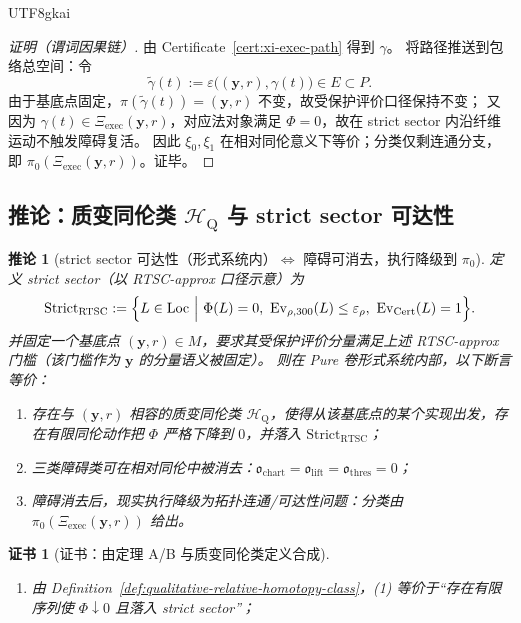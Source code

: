 \documentclass[12pt]{article}
\newtheorem{corollary}{推论}[section]
\newtheorem{certificate}{证书}[section]
\begin{document}
\begin{CJK*}{UTF8}{gkai}
\begin{proof}[证明（谓词因果链）]
由 Certificate~\ref{cert:xi-exec-path} 得到 $\gamma$。
将路径推送到包络总空间：令
\[
\widetilde{\gamma}(t):=\varepsilon\bigl((\mathbf{y},r),\gamma(t)\bigr)\in E\subset P.
\]
由于基底点固定，$\pi(\widetilde{\gamma}(t))=(\mathbf{y},r)$ 不变，故受保护评价口径保持不变；
又因为 $\gamma(t)\in \Xi_{\mathrm{exec}}(\mathbf{y},r)$，对应法对象满足 $\Phi=0$，故在 strict sector 内沿纤维运动不触发障碍复活。
因此 $\xi_0,\xi_1$ 在相对同伦意义下等价；分类仅剩连通分支，即 $\pi_0(\Xi_{\mathrm{exec}}(\mathbf{y},r))$。证毕。
\end{proof}

\subsection{推论：质变同伦类 $\mathcal{H}_{\mathrm{Q}}$ 与 strict sector 可达性}

\begin{corollary}[strict sector 可达性（形式系统内）$\Longleftrightarrow$ 障碍可消去，执行降级到 $\pi_0$]
\label{cor:qualitative-breakthrough}
定义 strict sector（以 \textsf{RTSC-approx} 口径示意）为
\[
\mathrm{Strict}_{\mathrm{RTSC}}
:=
\Bigl\{
L\in\mathrm{Loc}\ \Big|\ \Phi(L)=0,\ \mathrm{Ev}_{\rho,300}(L)\le \varepsilon_{\rho},\ \mathrm{Ev}_{\mathrm{Cert}}(L)=1
\Bigr\}.
\]
并固定一个基底点 $(\mathbf{y},r)\in M$，要求其受保护评价分量满足上述 \textsf{RTSC-approx} 门槛（该门槛作为 $\mathbf{y}$ 的分量语义被固定）。
则在 Pure 卷形式系统内部，以下断言等价：
\begin{enumerate}
  \item 存在与 $(\mathbf{y},r)$ 相容的质变同伦类 $\mathcal{H}_{\mathrm{Q}}$，使得从该基底点的某个实现出发，存在有限同伦动作把 $\Phi$ 严格下降到 $0$，并落入
    $\mathrm{Strict}_{\mathrm{RTSC}}$；
  \item 三类障碍类可在相对同伦中被消去：$\mathfrak{o}_{\mathrm{chart}}=\mathfrak{o}_{\mathrm{lift}}=\mathfrak{o}_{\mathrm{thres}}=0$；
  \item 障碍消去后，现实执行降级为拓扑连通/可达性问题：分类由 $\pi_0(\Xi_{\mathrm{exec}}(\mathbf{y},r))$ 给出。
\end{enumerate}
\end{corollary}

\begin{certificate}[证书：由定理 A/B 与质变同伦类定义合成]
\label{cert:qualitative-breakthrough}
\begin{enumerate}
  \item 由 Definition~\ref{def:qualitative-relative-homotopy-class}，(1) 等价于“存在有限序列使 $\Phi\downarrow 0$ 且落入 strict sector”；


\end{enumerate}
\end{certificate}
\end{CJK*}
\end{document}
